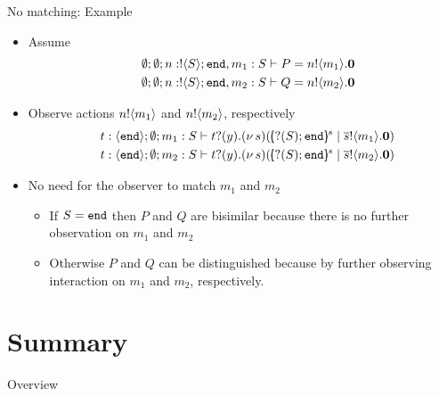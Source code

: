 \documentclass{beamer}
\newcommand{\currentsection}{
	\begin{frame}{Overview}
		\tableofcontents[currentsection]
	\end{frame}
}
\begin{document}
	\begin{frame}{No matching: Example}
			\begin{itemize}
				\item	Assume
					\begin{eqnarray*}
						&&\emptyset; \emptyset; n: ! \langle S \rangle ; \mathtt{end}, m_1 : S \vdash P = n ! \langle m_1 \rangle . \mathbf{0} \\
						&&\emptyset; \emptyset; n: ! \langle S \rangle ; \mathtt{end}, m_2 : S \vdash Q = n ! \langle m_2 \rangle . \mathbf{0}
					\end{eqnarray*}
				\item	Observe actions $n ! \langle m_1 \rangle$ and $n ! \langle m_2 \rangle$, respectively
					\begin{eqnarray*}
						&& t: \chtype{\tinact}; \es; m_1 : S \proves \binp{t}{y} \newsp{s}{\mapchar{\btinp{S} \tinact}{s}\Par \bout{\dual{s}}{m_1}\inact} \\
						&& t: \chtype{\tinact}; \es; m_2 : S \proves \binp{t}{y} \newsp{s}{\mapchar{\btinp{S} \tinact}{s}\Par \bout{\dual{s}}{m_2}\inact} 
					\end{eqnarray*}


				\item	No need for the observer to match $m_1$ and $m_2$
				\begin{itemize}
					\item	If $S = \mathtt{end}$ then $P$ and $Q$ are bisimilar because there is no further observation on $m_1$ and $m_2$
					\item	Otherwise $P$ and $Q$ can be distinguished because by further observing interaction on $m_1$ and $m_2$,
						respectively.
				\end{itemize}
			\end{itemize}
	\end{frame}

	\section{Summary}
	\currentsection
\end{document}
